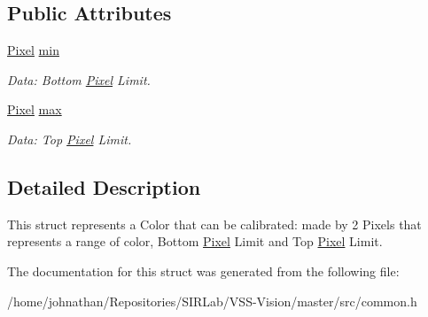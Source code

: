 \subsection*{Public Attributes}
\begin{DoxyCompactItemize}
\item 
\hyperlink{structcommon_1_1Pixel}{Pixel} \hyperlink{structcommon_1_1VisionColor_a3a8a40c24233df23f44510fce5846aaf}{min}\hypertarget{structcommon_1_1VisionColor_a3a8a40c24233df23f44510fce5846aaf}{}\label{structcommon_1_1VisionColor_a3a8a40c24233df23f44510fce5846aaf}

\begin{DoxyCompactList}\small\item\em Data\+: Bottom \hyperlink{structcommon_1_1Pixel}{Pixel} Limit. \end{DoxyCompactList}\item 
\hyperlink{structcommon_1_1Pixel}{Pixel} \hyperlink{structcommon_1_1VisionColor_adc2c9c3c09c9694f7ce8e9c8d94407bd}{max}\hypertarget{structcommon_1_1VisionColor_adc2c9c3c09c9694f7ce8e9c8d94407bd}{}\label{structcommon_1_1VisionColor_adc2c9c3c09c9694f7ce8e9c8d94407bd}

\begin{DoxyCompactList}\small\item\em Data\+: Top \hyperlink{structcommon_1_1Pixel}{Pixel} Limit. \end{DoxyCompactList}\end{DoxyCompactItemize}


\subsection{Detailed Description}
This struct represents a Color that can be calibrated\+: made by 2 Pixels that represents a range of color, Bottom \hyperlink{structcommon_1_1Pixel}{Pixel} Limit and Top \hyperlink{structcommon_1_1Pixel}{Pixel} Limit. 

The documentation for this struct was generated from the following file\+:\begin{DoxyCompactItemize}
\item 
/home/johnathan/\+Repositories/\+S\+I\+R\+Lab/\+V\+S\+S-\/\+Vision/master/src/common.\+h\end{DoxyCompactItemize}
